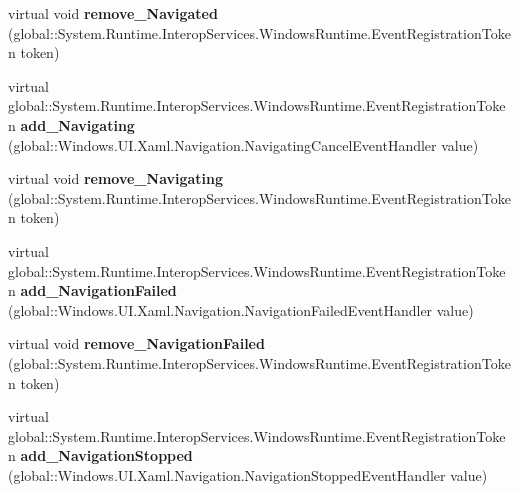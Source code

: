 \begin{DoxyCompactItemize}
\item 
\mbox{\label{class_windows_1_1_u_i_1_1_xaml_1_1_controls_1_1_frame_a6ba58ec5fb87b903e976124fe13e19c0}} 
virtual void {\bfseries remove\+\_\+\+Navigated} (global\+::\+System.\+Runtime.\+Interop\+Services.\+Windows\+Runtime.\+Event\+Registration\+Token token)
\item 
\mbox{\label{class_windows_1_1_u_i_1_1_xaml_1_1_controls_1_1_frame_afe49379e4ea3f7d217517f9ee7ba2bf9}} 
virtual global\+::\+System.\+Runtime.\+Interop\+Services.\+Windows\+Runtime.\+Event\+Registration\+Token {\bfseries add\+\_\+\+Navigating} (global\+::\+Windows.\+U\+I.\+Xaml.\+Navigation.\+Navigating\+Cancel\+Event\+Handler value)
\item 
\mbox{\label{class_windows_1_1_u_i_1_1_xaml_1_1_controls_1_1_frame_acc34f8b3bc84d17cad43aca5bcf5e0d4}} 
virtual void {\bfseries remove\+\_\+\+Navigating} (global\+::\+System.\+Runtime.\+Interop\+Services.\+Windows\+Runtime.\+Event\+Registration\+Token token)
\item 
\mbox{\label{class_windows_1_1_u_i_1_1_xaml_1_1_controls_1_1_frame_aa26741405bfc110f4b1b1905879092fd}} 
virtual global\+::\+System.\+Runtime.\+Interop\+Services.\+Windows\+Runtime.\+Event\+Registration\+Token {\bfseries add\+\_\+\+Navigation\+Failed} (global\+::\+Windows.\+U\+I.\+Xaml.\+Navigation.\+Navigation\+Failed\+Event\+Handler value)
\item 
\mbox{\label{class_windows_1_1_u_i_1_1_xaml_1_1_controls_1_1_frame_a5d519629c46865af9d6caf0f44a517fd}} 
virtual void {\bfseries remove\+\_\+\+Navigation\+Failed} (global\+::\+System.\+Runtime.\+Interop\+Services.\+Windows\+Runtime.\+Event\+Registration\+Token token)
\item 
\mbox{\label{class_windows_1_1_u_i_1_1_xaml_1_1_controls_1_1_frame_a6bf2da59d0a90e490aecaa3f355783ac}} 
virtual global\+::\+System.\+Runtime.\+Interop\+Services.\+Windows\+Runtime.\+Event\+Registration\+Token {\bfseries add\+\_\+\+Navigation\+Stopped} (global\+::\+Windows.\+U\+I.\+Xaml.\+Navigation.\+Navigation\+Stopped\+Event\+Handler value)

\end{DoxyCompactItemize}
